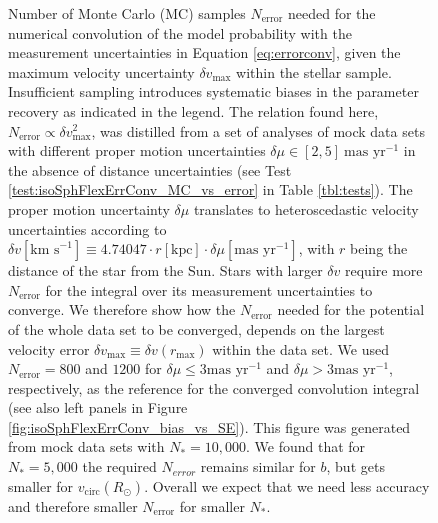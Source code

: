 \begin{figure}[!htbp]
\caption{Number of Monte Carlo (MC) samples $N_\text{error}$ needed for the numerical convolution of the model probability with the measurement uncertainties in Equation \ref{eq:errorconv}, given the maximum velocity uncertainty $\delta v_\text{max}$ within the stellar sample. Insufficient sampling introduces systematic biases in the parameter recovery as indicated in the legend. The relation found here, $N_\text{error} \propto \delta v_\text{max}^2$, was distilled from a set of analyses of mock data sets with different proper motion uncertainties $\delta \mu \in [2,5]~\text{mas yr}^{-1}$ in the absence of distance uncertainties (see Test \ref{test:isoSphFlexErrConv_MC_vs_error} in Table \ref{tbl:tests}). The proper motion uncertainty $\delta \mu$ translates to heteroscedastic  velocity uncertainties according to $\delta v [\text{km s}^{-1}] \equiv 4.74047 \cdot r[\text{kpc}] \cdot \delta \mu [\text{mas yr}^{-1}]$, with $r$ being the distance of the star from the Sun. Stars with larger $\delta v$ require more $N_\text{error}$ for the integral over its measurement uncertainties to converge. We therefore show how the $N_\text{error}$ needed for the potential \pdf{} of the whole data set to be converged, depends on the largest velocity error $\delta v_\text{max} \equiv \delta v(r_\text{max})$ within the data set. We used $N_\text{error} = 800$ and  $1200$ for $\delta \mu \leq 3 \text{mas yr}^{-1}$ and $\delta \mu > 3 \text{mas yr}^{-1}$, respectively, as the reference for the converged convolution integral (see also left panels in Figure \ref{fig:isoSphFlexErrConv_bias_vs_SE}). This figure was generated from mock data sets with $N_{*}=10,000$. We found that for $N_{*}=5,000$ the required $N_{error}$ remains similar for $b$, but gets smaller for $v_\text{circ}(R_\odot)$. Overall we expect that we need less accuracy and therefore smaller $N_\text{error}$ for smaller $N_{*}$. }
\label{fig:isoSphFlexErrConv_MC_vs_error}
\end{figure}




